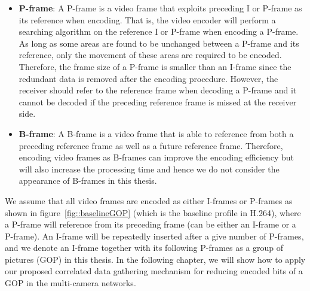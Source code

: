 {\begin{itemize}
The interval between successive I-frames is an important issue in the H.264 video compression technique.
On one hand, I-frames are necessary for random accessing different parts of the video files since they are the only frame type which can be decoded independently.
On the other hand, encoding video frames as I-frames has the drawback that they are the largest in terms of frame size since only intra-frame redundancy can be removed for this type of frames.
\item \textbf{P-frame}:
A P-frame is a video frame that exploits preceding I or P-frame as its reference when encoding.
That is, the video encoder will perform a searching algorithm on the reference I or P-frame when encoding a P-frame.
As long as some areas are found to be unchanged between a P-frame and its reference, only the movement of these areas are required to be encoded.
Therefore, the frame size of a P-frame is smaller than an I-frame since the redundant data is removed after the encoding procedure.
However, the receiver should refer to the reference frame when decoding a P-frame and it cannot be decoded if the preceding reference frame is missed at the receiver side.
\item \textbf{B-frame}:
A B-frame is a video frame that is able to reference from both a preceding reference frame as well as a future reference frame.
Therefore, encoding video frames as B-frames can improve the encoding efficiency but will also increase the processing time and hence we do not consider the appearance of B-frames in this thesis.
\end{itemize}

We assume that all video frames are encoded as either I-frames or P-frames as shown in figure~\ref{fig::baselineGOP} (which is the baseline profile in H.264), where a P-frame will reference from its preceding frame (can be either an I-frame or a P-frame).
An I-frame will be repeatedly inserted after a give number of P-frames, and we denote an I-frame together with its following P-frames as a group of pictures (GOP) in this thesis.
In the following chapter, we will show how to apply our proposed correlated data gathering mechanism for reducing encoded bits of a GOP in the multi-camera networks.
%
}
